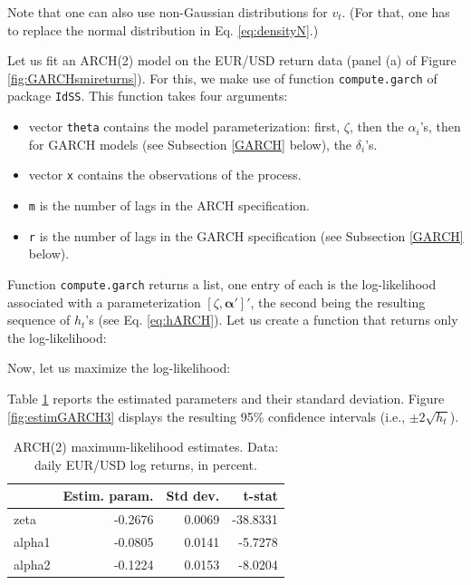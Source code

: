 \documentclass[
  11pt,
]{book}
\providecommand{\tightlist}{%
  \setlength{\itemsep}{0pt}\setlength{\parskip}{0pt}}
\theoremstyle{definition}
\theoremstyle{definition}
\theoremstyle{definition}
\theoremstyle{definition}
\theoremstyle{remark}
\begin{document}
Note that one can also use non-Gaussian distributions for \(v_t\). (For that, one has to replace the normal distribution in Eq. \eqref{eq:densityN}.)

Let us fit an ARCH(2) model on the EUR/USD return data (panel (a) of Figure \ref{fig:GARCHsmireturns}). For this, we make use of function \texttt{compute.garch} of package \texttt{IdSS}. This function takes four arguments:

\begin{itemize}
\tightlist
\item
  vector \texttt{theta} contains the model parameterization: first, \(\zeta\), then the \(\alpha_i\)'s, then for GARCH models (see Subsection \ref{GARCH} below), the \(\delta_i\)'s.
\item
  vector \texttt{x} contains the observations of the process.
\item
  \texttt{m} is the number of lags in the ARCH specification.
\item
  \texttt{r} is the number of lags in the GARCH specification (see Subsection \ref{GARCH} below).
\end{itemize}

Function \texttt{compute.garch} returns a list, one entry of each is the log-likelihood associated with a parameterization \([\zeta,\boldsymbol\alpha']'\), the second being the resulting sequence of \(h_t\)'s (see Eq. \eqref{eq:hARCH}). Let us create a function that returns only the log-likelihood:

Now, let us maximize the log-likelihood:

Table \ref{tab:estimGARCH2} reports the estimated parameters and their standard deviation. Figure \ref{fig:estimGARCH3} displays the resulting 95\% confidence intervals (i.e., \(\pm 2 \sqrt{h_t}\)).

\begin{table}

\caption{\label{tab:estimGARCH2}ARCH(2) maximum-likelihood estimates.
             Data: daily EUR/USD log returns, in percent.}
\centering
\begin{tabular}[t]{l|r|r|r}
\hline
  & Estim. param. & Std dev. & t-stat\\
\hline
zeta & -0.2676 & 0.0069 & -38.8331\\
\hline
alpha1 & -0.0805 & 0.0141 & -5.7278\\
\hline
alpha2 & -0.1224 & 0.0153 & -8.0204\\
\hline
\end{tabular}
\end{table}
\end{document}
